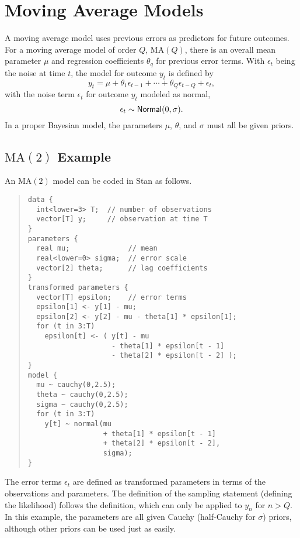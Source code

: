 \section{Moving Average Models}

A moving average model uses previous errors as predictors for future
outcomes.  For a moving average model of order $Q$, $\mbox{MA}(Q)$,
there is an overall mean parameter $\mu$ and regression coefficients
$\theta_q$ for previous error terms.  With $\epsilon_t$ being the
noise at time $t$, the model for outcome $y_t$ is defined by
\[
y_t = \mu + \theta_1 \epsilon_{t-1} + \cdots + \theta_Q \epsilon_{t-Q}
+ \epsilon_t,
\]
with the noise term $\epsilon_t$ for outcome $y_t$ modeled as
normal,
\[
\epsilon_t \sim \mbox{\sf Normal}(0,\sigma).
\]
In a proper Bayesian model, the parameters $\mu$, $\theta$, and
$\sigma$ must all be given priors.

\subsection{$\mbox{MA}(2)$ Example}

An $\mbox{MA}(2)$ model can be coded in Stan as follows.
%
\begin{quote}
\begin{Verbatim}[fontsize=\small]
data {
  int<lower=3> T;  // number of observations
  vector[T] y;     // observation at time T
}
parameters {
  real mu;              // mean
  real<lower=0> sigma;  // error scale
  vector[2] theta;      // lag coefficients
}
transformed parameters {
  vector[T] epsilon;    // error terms
  epsilon[1] <- y[1] - mu;
  epsilon[2] <- y[2] - mu - theta[1] * epsilon[1];
  for (t in 3:T)
    epsilon[t] <- ( y[t] - mu
                    - theta[1] * epsilon[t - 1]
                    - theta[2] * epsilon[t - 2] );
}
model {
  mu ~ cauchy(0,2.5);
  theta ~ cauchy(0,2.5);
  sigma ~ cauchy(0,2.5);
  for (t in 3:T)
    y[t] ~ normal(mu 
                  + theta[1] * epsilon[t - 1]
                  + theta[2] * epsilon[t - 2],
                  sigma);
}
\end{Verbatim}
\end{quote}
%
The error terms $\epsilon_t$ are defined as transformed parameters in
terms of the observations and parameters.  The definition of the
sampling statement (defining the likelihood) follows the definition,
which can only be applied to $y_n$ for $n > Q$.  In this example, the
parameters are all given Cauchy (half-Cauchy for $\sigma$) priors,
although other priors can be used just as easily.

